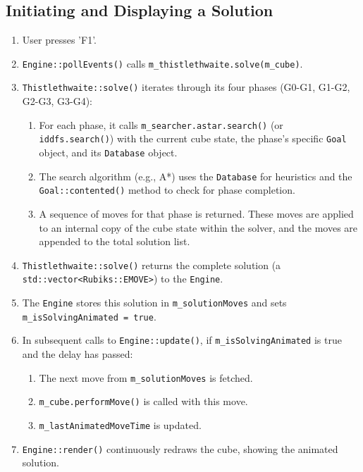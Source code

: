 \documentclass[11pt, a4paper]{article}
\begin{document}
\subsection{Initiating and Displaying a Solution}
\begin{enumerate}
    \item User presses 'F1'.
    \item \texttt{Engine::pollEvents()} calls \texttt{m\_thistlethwaite.solve(m\_cube)}.
    \item \texttt{Thistlethwaite::solve()} iterates through its four phases (G0-G1, G1-G2, G2-G3, G3-G4):
        \begin{enumerate}
            \item For each phase, it calls \texttt{m\_searcher.astar.search()} (or \texttt{iddfs.search()}) with the current cube state, the phase's specific \texttt{Goal} object, and its \texttt{Database} object.
            \item The search algorithm (e.g., A*) uses the \texttt{Database} for heuristics and the \texttt{Goal::contented()} method to check for phase completion.
            \item A sequence of moves for that phase is returned. These moves are applied to an internal copy of the cube state within the solver, and the moves are appended to the total solution list.
        \end{enumerate}
    \item \texttt{Thistlethwaite::solve()} returns the complete solution (a \texttt{std::vector<Rubiks::EMOVE>}) to the \texttt{Engine}.
    \item The \texttt{Engine} stores this solution in \texttt{m\_solutionMoves} and sets \texttt{m\_isSolvingAnimated = true}.
    \item In subsequent calls to \texttt{Engine::update()}, if \texttt{m\_isSolvingAnimated} is true and the delay has passed:
        \begin{enumerate}
            \item The next move from \texttt{m\_solutionMoves} is fetched.
            \item \texttt{m\_cube.performMove()} is called with this move.
            \item \texttt{m\_lastAnimatedMoveTime} is updated.
        \end{enumerate}
    \item \texttt{Engine::render()} continuously redraws the cube, showing the animated solution.
\end{enumerate}
\end{document}
